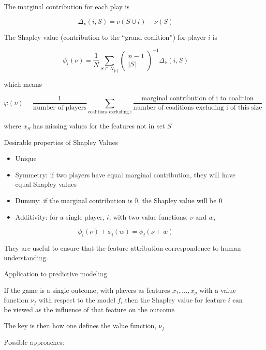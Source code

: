 \documentclass[
]{book}
\begin{document}
The marginal contribution for each play is

\[
\Delta_\nu (i,S) = \nu (S \cup i) - \nu(S)
\]

The Shapley value (contribution to the ``grand coalition'') for player \(i\) is

\[
\phi_i (\nu) = \frac{1}{N} \sum_{S \subseteq N_{\{i\}}} 
\left(
\begin{array}
{c}
n-1 \\
|S|
\end{array}
\right) ^{-1}
\Delta_\nu (i,S)
\]

which means

\[
\varphi (\nu) = \frac{1}{\text{number of players}} \sum_{\text{coalitions excluding i}} \frac{\text{marginal contribution of i to coalition}}{\text{number of coalitions excluding i of this size}}
\]

where \(x_S\) has missing values for the features not in set \(S\)

Desirable properties of Shapley Values

\begin{itemize}
\item
  Unique
\item
  Symmetry: if two players have equal marginal contribution, they will have equal Shapley values
\item
  Dummy: if the marginal contribution is 0, the Shapley value will be 0
\item
  Additivity: for a single player, \(i\), with two value functions, \(\nu\) and \(w\),
\end{itemize}

\[
\phi_i(\nu) + \phi_i (w) = \phi_i (\nu + w)
\]

They are useful to ensure that the feature attribution correspondence to human understanding.

Application to predictive modeling

If the game is a single outcome, with players as features \(x_1, \dots, x_p\) with a value function \(\nu_f\) with respect to the model \(f\), then the Shapley value for feature \(i\) can be viewed as the influence of that feature on the outcome

The key is then how one defines the value function, \(\nu_f\)

Possible approaches:
\end{document}
